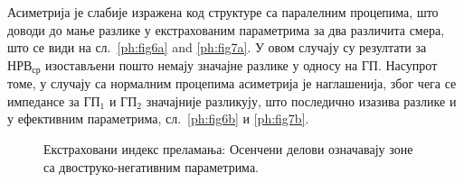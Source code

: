 \documentclass[main.tex]{subfiles}
\begin{document}
Асиметрија је слабије изражена код структуре са паралелним процепима, што доводи до мање разлике у екстрахованим параметрима за два различита смера, што се види на сл.~\ref{ph:fig6a} and \ref{ph:fig7a}. У овом случају су резултати за $НРВ_{ср}$ изостављени пошто немају значајне разлике у односу на ГП. Насупрот томе, у случају са нормалним процепима асиметрија је наглашенија, због чега се импедансе за $ГП_1$ и $ГП_2$ значајније разликују, што последично изазива разлике и у ефективним параметрима, сл.~\ref{ph:fig6b} и \ref{ph:fig7b}.
\begin{figure}[!t]
\centering
{}
\hfill
{}
\caption{Екстраховани индекс преламања:  Осенчени делови означавају зоне са двоструко-негативним параметрима.}
\label{ph:fig4}
\end{figure} 
\end{document}
